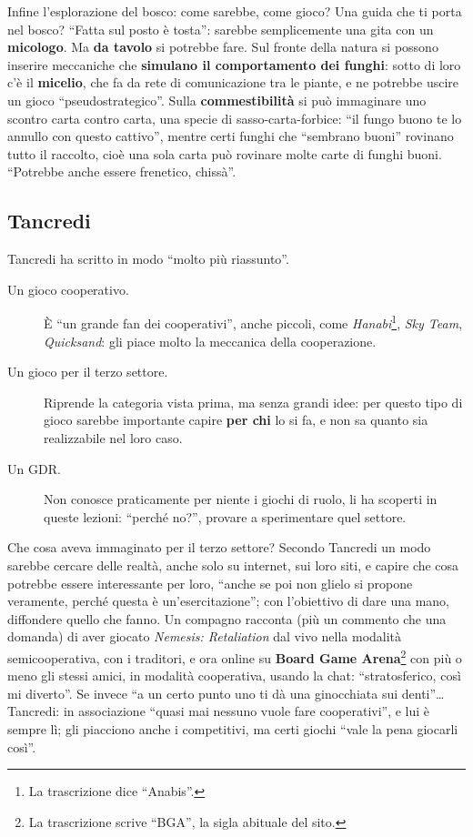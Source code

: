 Infine l'esplorazione del bosco: come sarebbe, come gioco? Una guida che ti porta nel
bosco? ``Fatta sul posto è tosta'': sarebbe semplicemente una gita con un
\textbf{micologo}. Ma \textbf{da tavolo} si potrebbe fare. Sul fronte della natura si
possono inserire meccaniche che \textbf{simulano il comportamento dei funghi}: sotto
di loro c'è il \textbf{micelio}, che fa da rete di comunicazione tra le piante, e ne
potrebbe uscire un gioco ``pseudostrategico''. Sulla \textbf{commestibilità} si può
immaginare uno scontro carta contro carta, una specie di sasso-carta-forbice: ``il
fungo buono te lo annullo con questo cattivo'', mentre certi funghi che ``sembrano
buoni'' rovinano tutto il raccolto, cioè una sola carta può rovinare molte carte di
funghi buoni. ``Potrebbe anche essere frenetico, chissà''.

\subsection{Tancredi}
\label{a7:sec:idee-tancredi}

Tancredi ha scritto in modo ``molto più riassunto''.
\begin{description}
  \item[Un gioco cooperativo.] È ``un grande fan dei cooperativi'', anche piccoli,
        come \emph{Hanabi}\footnote{La trascrizione dice ``Anabis''.}, \emph{Sky Team},
        \emph{Quicksand}: gli piace molto la meccanica della cooperazione.
  \item[Un gioco per il terzo settore.] Riprende la categoria vista prima, ma senza
        grandi idee: per questo tipo di gioco sarebbe importante capire \textbf{per chi}
        lo si fa, e non sa quanto sia realizzabile nel loro caso.
  \item[Un GDR.] Non conosce praticamente per niente i giochi di ruolo, li ha
        scoperti in queste lezioni: ``perché no?'', provare a sperimentare quel
        settore.
\end{description}
Che cosa aveva immaginato per il terzo settore? Secondo Tancredi un modo sarebbe
cercare delle realtà, anche solo su internet, sui loro siti, e capire che cosa
potrebbe essere interessante per loro, ``anche se poi non glielo si propone
veramente, perché questa è un'esercitazione''; con l'obiettivo di dare una mano,
diffondere quello che fanno. Un compagno racconta (più un commento che una domanda)
di aver giocato \emph{Nemesis: Retaliation} dal vivo nella modalità semicooperativa,
con i traditori, e ora online su \textbf{Board Game Arena}\footnote{La trascrizione
scrive ``BGA'', la sigla abituale del sito.} con più o meno gli stessi amici, in
modalità cooperativa, usando la chat: ``stratosferico, così mi diverto''. Se invece
``a un certo punto uno ti dà una ginocchiata sui denti''\ldots{} Tancredi: in
associazione ``quasi mai nessuno vuole fare cooperativi'', e lui è sempre lì; gli
piacciono anche i competitivi, ma certi giochi ``vale la pena giocarli così''.

